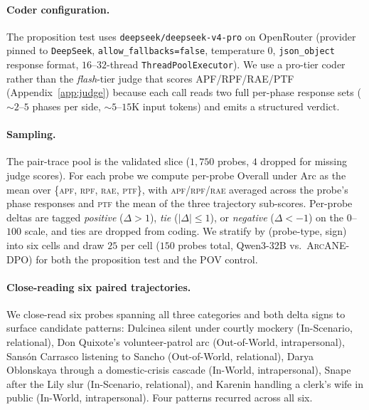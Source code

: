 \documentclass[11pt]{article}
\newcommand{\ours}{\textsc{ArcANE}}
\begin{document}
\paragraph{Coder configuration.} The proposition test uses \texttt{deepseek/deepseek-v4-pro} on OpenRouter (provider pinned to \texttt{DeepSeek}, \texttt{allow\_fallbacks=false}, temperature $0$, \texttt{json\_object} response format, $16$--$32$-thread \texttt{ThreadPoolExecutor}). We use a pro-tier coder rather than the \emph{flash}-tier judge that scores APF/RPF/RAE/PTF (Appendix~\ref{app:judge}) because each call reads two full per-phase response sets ($\sim$$2$--$5$ phases per side, $\sim$$5$--$15$K input tokens) and emits a structured verdict.

\paragraph{Sampling.}
The pair-trace pool is the validated slice ($1{,}750$ probes, $4$ dropped for missing judge scores). For each probe we compute per-probe Overall under Arc as the mean over \{\textsc{apf}, \textsc{rpf}, \textsc{rae}, \textsc{ptf}\}, with \textsc{apf}/\textsc{rpf}/\textsc{rae} averaged across the probe's phase responses and \textsc{ptf} the mean of the three trajectory sub-scores. Per-probe deltas are tagged \emph{positive} ($\Delta > 1$), \emph{tie} ($|\Delta| \leq 1$), or \emph{negative} ($\Delta < -1$) on the $0$--$100$ scale, and ties are dropped from coding. We stratify by (probe-type, sign) into six cells and draw $25$ per cell ($150$ probes total, Qwen3-32B vs.\ \ours{}-DPO) for both the proposition test and the POV control.

\paragraph{Close-reading six paired trajectories.}
We close-read six probes spanning all three categories and both delta signs to surface candidate patterns: Dulcinea silent under courtly mockery (In-Scenario, relational), Don Quixote's volunteer-patrol arc (Out-of-World, intrapersonal), Sansón Carrasco listening to Sancho (Out-of-World, relational), Darya Oblonskaya through a domestic-crisis cascade (In-World, intrapersonal), Snape after the Lily slur (In-Scenario, relational), and Karenin handling a clerk's wife in public (In-World, intrapersonal). Four patterns recurred across all six.
\end{document}
